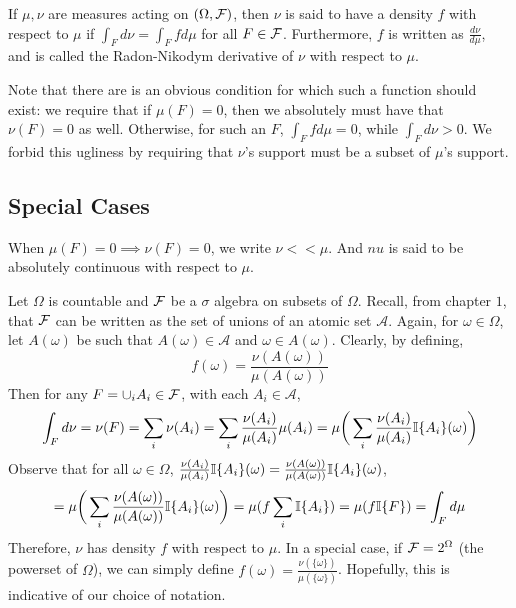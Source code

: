 \begin{definition}[Density]
    If $\mu,\nu$ are measures acting on $(\Omega, \mathcal F)$, then $\nu$ is said to have 
    a density $f$ with respect to $\mu$ if $\int_F d\nu = \int_F f d\mu$ for all 
    $F \in \mathcal F$. Furthermore, $f$ is written as $\frac{d\nu}{d\mu}$, and is called the 
    Radon-Nikodym derivative of $\nu$ with respect to $\mu$.
\end{definition}

Note that there are is an obvious condition for which such a function should exist: 
we require that if $\mu(F) = 0$, then we absolutely must have that $\nu(F) = 0$ as well. 
Otherwise, for such an $F$, $\int_F f d\mu = 0$, while $\int_F d\nu > 0$. 
We forbid this ugliness by requiring that $\nu$'s support must be a subset of $\mu$'s support.

\subsection{Special Cases}

\begin{definition} When 
$\mu(F) = 0 \implies \nu(F) = 0$, we write $\nu << \mu$. And $nu$ is said to be absolutely 
continuous with respect to $\mu$. 
\end{definition}

\begin{example}
    Let $\Omega$ is countable and $\mathcal F$ be a $\sigma$ algebra on subsets of 
    $\Omega$. Recall, from chapter $1$, that $\mathcal F$ can be written as the set of unions of 
    an atomic set $\mathcal A$. Again, for $\omega \in \Omega$, let $A(\omega)$ be 
    such that $A(\omega) \in \mathcal A$ and $\omega \in A(\omega)$. Clearly, by defining, 
    \[ f(\omega) = \frac{\nu(A(\omega))}{\mu(A(\omega))} \]
    Then for any $F = \cup_i A_i \in \mathcal F$, with each $A_i \in \mathcal A$, 
    \[ \int_F d\nu = \nu(F) = \sum_{i}\nu(A_i) = \sum_{i} \frac{\nu(A_i)}{\mu(A_i)}\mu(A_i) = \mu\bigg(\sum_i \frac{\nu(A_i)}{\mu(A_i)} \mathbb I\{A_i\}(\omega) \bigg) \]
    Observe that for all $\omega \in \Omega$, $\frac{\nu(A_i)}{\mu(A_i)} \mathbb I\{A_i\}(\omega) = \frac{\nu(A(\omega))}{\mu(A(\omega))} \mathbb I\{A_i\}(\omega)$,
    \[ = \mu\bigg(\sum_i \frac{\nu(A(\omega))}{\mu(A(\omega))} \mathbb I\{A_i\}(\omega) \bigg) = \mu(f\sum_i \mathbb I\{A_i\}) = \mu(f\mathbb I\{F\}) = \int_F d\mu  \]
    Therefore, $\nu$ has density $f$ with respect to $\mu$. In a special case, if $\mathcal F = 2^\Omega$ (the powerset of $\Omega$), we can simply define 
    $f(\omega) = \frac{\nu(\{\omega\})}{\mu(\{\omega\})}$. Hopefully, this is indicative of our choice of 
    notation.
\end{example}

